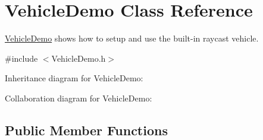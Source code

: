\hypertarget{class_vehicle_demo}{\section{Vehicle\+Demo Class Reference}
\label{class_vehicle_demo}
}


\hyperlink{class_vehicle_demo}{Vehicle\+Demo} shows how to setup and use the built-\/in raycast vehicle.  




{\ttfamily \#include $<$Vehicle\+Demo.\+h$>$}



Inheritance diagram for Vehicle\+Demo\+:


Collaboration diagram for Vehicle\+Demo\+:
\subsection*{Public Member Functions}
